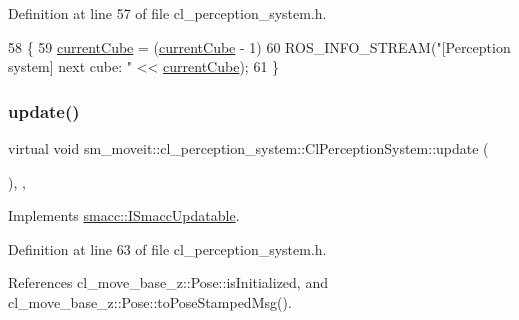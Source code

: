 Definition at line 57 of file cl\+\_\+perception\+\_\+system.\+h.


\begin{DoxyCode}
58     \{
59         \hyperlink{classsm__moveit_1_1cl__perception__system_1_1ClPerceptionSystem_a0ffeadfa41480c9d4d0fcc509237dff6}{currentCube} = (\hyperlink{classsm__moveit_1_1cl__perception__system_1_1ClPerceptionSystem_a0ffeadfa41480c9d4d0fcc509237dff6}{currentCube} - 1) %
60         ROS\_INFO\_STREAM(\textcolor{stringliteral}{"[Perception system] next cube: "} << \hyperlink{classsm__moveit_1_1cl__perception__system_1_1ClPerceptionSystem_a0ffeadfa41480c9d4d0fcc509237dff6}{currentCube});
61     \}
\end{DoxyCode}
\mbox{\label{classsm__moveit_1_1cl__perception__system_1_1ClPerceptionSystem_aaefca9001d3836655d38ee92621c013e}} 
\subsubsection{\texorpdfstring{update()}{update()}}
{\footnotesize\ttfamily virtual void sm\+\_\+moveit\+::cl\+\_\+perception\+\_\+system\+::\+Cl\+Perception\+System\+::update (\begin{DoxyParamCaption}{ }\end{DoxyParamCaption})\hspace{0.3cm}{\ttfamily [inline]}, {\ttfamily [override]}, {\ttfamily [virtual]}}



Implements \hyperlink{classsmacc_1_1ISmaccUpdatable_a84ee0520cbefdb1d412bed54650b028e}{smacc\+::\+I\+Smacc\+Updatable}.



Definition at line 63 of file cl\+\_\+perception\+\_\+system.\+h.



References cl\+\_\+move\+\_\+base\+\_\+z\+::\+Pose\+::is\+Initialized, and cl\+\_\+move\+\_\+base\+\_\+z\+::\+Pose\+::to\+Pose\+Stamped\+Msg().


